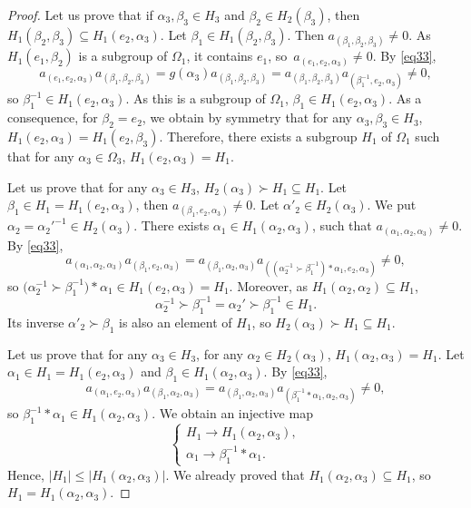 \documentclass[10pt,a4paper]{amsart}
\numberwithin{equation}{section}
\begin{document}
\begin{proof}
Let us prove that if $\alpha_3,\beta_3\in H_3$ and $\beta_2\in H_2(\beta_3)$, then $H_1(\beta_2,\beta_3)\subseteq H_1(e_2,\alpha_3)$. Let $\beta_1\in H_1(\beta_2,\beta_3)$.
Then $a_{(\beta_1,\beta_2,\beta_3)}\neq 0$. As $H_1(e_1,\beta_2)$ is a subgroup of $\Omega_1$, it contains $e_1$, so~${a_{(e_1,e_2,\alpha_3)}\neq 0}$. By \eqref{eq33},
\[a_{(e_1,e_2,\alpha_3)}a_{(\beta_1,\beta_2,\beta_3)}=g(\alpha_3)a_{(\beta_1,\beta_2,\beta_3)}=a_{(\beta_1,\beta_2,\beta_3)}a_{(\beta_1^{-1},e_2,\alpha_3)}\neq 0,\]
so $\beta_1^{-1}\in H_1(e_2,\alpha_3)$. As this is a subgroup of $\Omega_1$, $\beta_1\in H_1(e_2,\alpha_3)$.
As a consequence, for $\beta_2=e_2$, we obtain by symmetry that for any $\alpha_3,\beta_3\in H_3$, $H_1(e_2,\alpha_3)=H_1(e_2,\beta_3)$.
Therefore, there exists a subgroup $H_1$ of $\Omega_1$ such that for any $\alpha_3\in \Omega_3$, $H_1(e_2,\alpha_3)=H_1$.

Let us prove that for any $\alpha_3\in H_3$, $H_2(\alpha_3)\succ H_1\subseteq H_1$. Let $\beta_1\in H_1=H_1(e_2,\alpha_3)$, then $a_{(\beta_1,e_2,\alpha_3)}\neq 0$. Let $\alpha'_2\in H_2(\alpha_3)$.
We put $\alpha_2=\alpha_2'^{-1}\in H_2(\alpha_3)$. There exists $\alpha_1\in H_1(\alpha_2,\alpha_3)$, such that $a_{(\alpha_1,\alpha_2,\alpha_3)}\neq 0$. By \eqref{eq33},
 \[a_{(\alpha_1,\alpha_2,\alpha_3)}a_{(\beta_1,e_2,\alpha_3)}=a_{(\beta_1,\alpha_2,\alpha_3)}a_{((\alpha_2^{-1}\succ \beta_1^{-1})*\alpha_1,e_2,\alpha_3)}\neq 0,\]
so $\bigl(\alpha_2^{-1}\succ \beta_1^{-1}\bigr)*\alpha_1\in H_1(e_2,\alpha_3)=H_1$. Moreover, as $H_1(\alpha_2,\alpha_2)\subseteq H_1$,
\[\alpha_2^{-1}\succ \beta_1^{-1}=\alpha_2'\succ \beta_1^{-1}\in H_1.\]
Its inverse $ \alpha'_2\succ \beta_1$ is also an element of $H_1$, so $H_2(\alpha_3)\succ H_1\subseteq H_1$.

Let us prove that for any $\alpha_3\in H_3$, for any $\alpha_2\in H_2(\alpha_3)$, $H_1(\alpha_2,\alpha_3)=H_1$. Let $\alpha_1\in H_1=H_1(e_2,\alpha_3)$ and $\beta_1\in H_1(\alpha_2,\alpha_3)$. By \eqref{eq33},
\[a_{(\alpha_1,e_2,\alpha_3)}a_{(\beta_1,\alpha_2,\alpha_3)}=a_{(\beta_1,\alpha_2,\alpha_3)}a_{(\beta_1^{-1}*\alpha_1,\alpha_2,\alpha_3)}\neq 0,\]
so $\beta_1^{-1}*\alpha_1\in H_1(\alpha_2,\alpha_3)$. We obtain an injective map
\[\begin{cases}
H_1 \longrightarrow H_1(\alpha_2,\alpha_3),\\
\alpha_1 \longrightarrow \beta_1^{-1}*\alpha_1.
\end{cases}\]
Hence, $|H_1|\leqslant |H_1(\alpha_2,\alpha_3)|$. We already proved that $H_1(\alpha_2,\alpha_3)\subseteq H_1$, so $H_1=H_1(\alpha_2,\alpha_3)$.


\end{proof}
\end{document}
